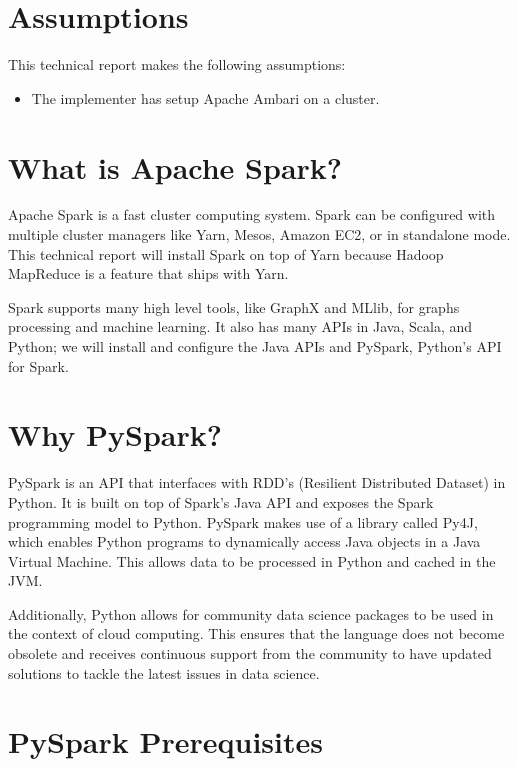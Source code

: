 \documentclass[9pt,twocolumn,twoside]{idsi}
\begin{document}
\makecoverpage

\maketitle

\section{Assumptions}

This technical report makes the following assumptions:
\begin{itemize}
\item The implementer has setup Apache Ambari on a cluster.
\end{itemize}

\section{What is Apache Spark?}

Apache Spark is a fast cluster computing system. Spark can be configured with multiple cluster managers like Yarn, Mesos, Amazon EC2, or in standalone mode. This technical report will install Spark on top of Yarn because Hadoop MapReduce is a feature that ships with Yarn.

Spark supports many high level tools, like GraphX and MLlib, for graphs processing and machine learning. It also has many APIs in Java, Scala, and Python; we will install and configure the Java APIs and PySpark, Python's API for Spark.

\section{Why PySpark?}

PySpark is an API that interfaces with RDD's (Resilient Distributed Dataset) in Python. It is built on top of Spark's Java API and exposes the Spark programming model to Python. PySpark makes use of a library called Py4J, which enables Python programs to dynamically access Java objects in a Java Virtual Machine. This allows data to be processed in Python and cached in the JVM.

Additionally, Python allows for community data science packages to be used in the context of cloud computing. This ensures that the language does not become obsolete and receives continuous support from the community to have updated solutions to tackle the latest issues in data science.

\section{PySpark Prerequisites}
\end{document}
